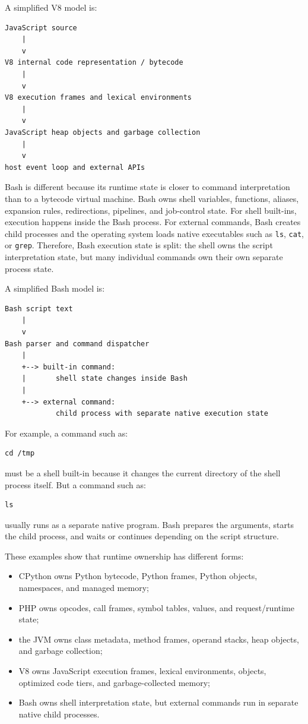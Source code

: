 \documentclass[a4paper,twoside]{report}
\begin{document}
A simplified V8 model is:

\begin{verbatim}
JavaScript source
    |
    v
V8 internal code representation / bytecode
    |
    v
V8 execution frames and lexical environments
    |
    v
JavaScript heap objects and garbage collection
    |
    v
host event loop and external APIs
\end{verbatim}

Bash is different because its runtime state is closer to command interpretation than to a bytecode virtual machine. Bash owns shell variables, functions, aliases, expansion rules, redirections, pipelines, and job-control state. For shell built-ins, execution happens inside the Bash process. For external commands, Bash creates child processes and the operating system loads native executables such as \texttt{ls}, \texttt{cat}, or \texttt{grep}. Therefore, Bash execution state is split: the shell owns the script interpretation state, but many individual commands own their own separate process state.

A simplified Bash model is:

\begin{verbatim}
Bash script text
    |
    v
Bash parser and command dispatcher
    |
    +--> built-in command:
    |       shell state changes inside Bash
    |
    +--> external command:
            child process with separate native execution state
\end{verbatim}

For example, a command such as:

\begin{verbatim}
cd /tmp
\end{verbatim}

must be a shell built-in because it changes the current directory of the shell process itself. But a command such as:

\begin{verbatim}
ls
\end{verbatim}

usually runs as a separate native program. Bash prepares the arguments, starts the child process, and waits or continues depending on the script structure.

These examples show that runtime ownership has different forms:

\begin{itemize}
    \item CPython owns Python bytecode, Python frames, Python objects, namespaces, and managed memory;
    \item PHP owns opcodes, call frames, symbol tables, values, and request/runtime state;
    \item the JVM owns class metadata, method frames, operand stacks, heap objects, and garbage collection;
    \item V8 owns JavaScript execution frames, lexical environments, objects, optimized code tiers, and garbage-collected memory;
    \item Bash owns shell interpretation state, but external commands run in separate native child processes.
\end{itemize}
\end{document}
